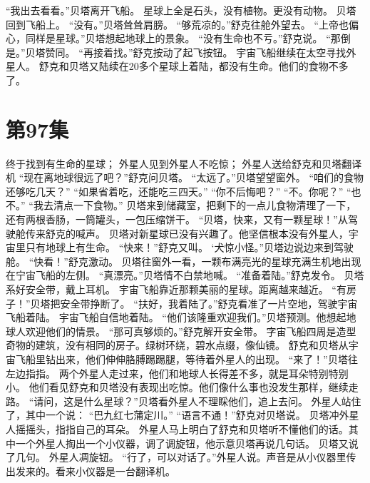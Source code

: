 \documentclass[a4paper,12pt,UTF8,twoside]{ctexbook}
\begin{document}
        “我出去看看。”贝塔离开飞船。 
        星球上全是石头，没有植物。更没有动物。 
        贝塔回到飞船上。 
        “没有。”贝塔耸耸肩膀。 
        “够荒凉的。”舒克往舱外望去。 
        “上帝也偏心，同样是星球。”贝塔想起地球上的景象。 
        “没有生命也不亏。”舒克说。 
        “那倒是。”贝塔赞同。 
        “再接着找。”舒克按动了起飞按钮。 
        宇宙飞船继续在太空寻找外星人。 
        舒克和贝塔又陆续在20多个星球上着陆，都没有生命。他们的食物不多了。   \chapter{第97集} 
        终于找到有生命的星球； 
        外星人见到外星人不吃惊； 
        外星人送给舒克和贝塔翻译机   
        “现在离地球很远了吧？”舒克问贝塔。 
        “太远了。”贝塔望望窗外。 
        “咱们的食物还够吃几天？” 
        “如果省着吃，还能吃三四天。” 
        “你不后悔吧？” 
        “不。你呢？” 
        “也不。” 
        “我去清点一下食物。” 
        贝塔来到储藏室，把剩下的一点儿食物清理了一下，还有两根香肠，一筒罐头，一包压缩饼干。 
        “贝塔，快来，又有一颗星球！”从驾驶舱传来舒克的喊声。 
        贝塔对新星球已没有兴趣了。他坚信根本没有外星人，宇宙里只有地球上有生命。 
        “快来！”舒克又叫。 
        ‘犬惊小怪。”贝塔边说边来到驾驶舱。 
        “快看！”舒克激动。 
        贝塔往窗外一看，一颗布满亮光的星球充满生机地出现在宁宙飞船的左侧。 
        “真漂亮。”贝塔情不白禁地喊。 
        “准备着陆。”舒克发令。 
        贝塔系好安全带，戴上耳机。 
        宇宙飞船靠近那颗美丽的星球。距离越来越近。 
        “有房子！”贝塔把安全带挣断了。 
        “扶好，我着陆了。”舒克看准了一片空地，驾驶宇宙飞船着陆。 
        宇宙飞船自信地着陆。 
        “他们该隆重欢迎我们。”贝塔预测。他想起地球人欢迎他们的情景。 
        “那可真够烦的。”舒克解开安全带。 
        字宙飞船四周是造型奇物的建筑，没有相同的房子。绿树环绕，碧水点缀，像仙镜。 
        舒克和贝塔从宇宙飞船里钻出来，他们伸伸胳膊踢踢腿，等待着外星人的出现。 
        “来了！”贝塔往左边指指。 
        两个外星人走过来，他们和地球人长得差不多，就是耳朵特别特别小。 
        他们看见舒克和贝塔没有表现出吃惊。他们像什么事也没发生那样，继续走路。 
        “请问，这是什么星球？”贝塔看外星人不理睬他们，追上去问。 
        外星人站住了，其中一个说： 
        “巴九红七蒲定川。” 
        “语言不通！”舒克对贝塔说。 
        贝塔冲外星人摇摇头，指指自己的耳朵。 
        外星人马上明白了舒克和贝塔听不懂他们的话。其中一个外星人掏出一个小仪器，调了调旋钮，他示意贝塔再说几句话。 
        贝塔又说了几句。 
        外星人凋旋钮。 
        “行了，可以对话了。”外星人说。声音是从小仪器里传出发来的。看来小仪器是一台翻译机。 
\end{document}

